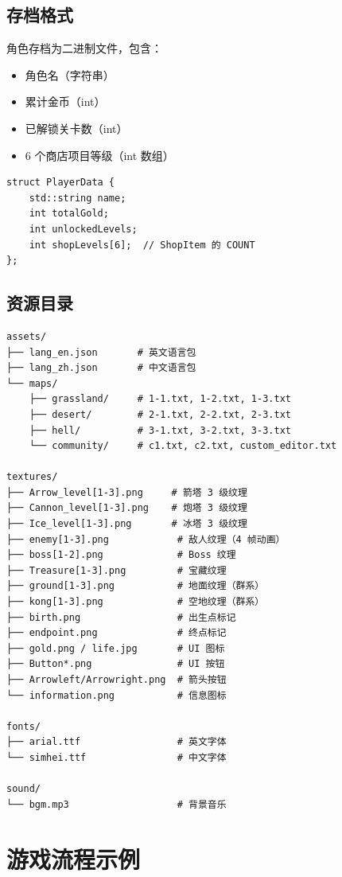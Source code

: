 \documentclass[12pt,a4paper]{ctexart}
\begin{document}
\subsection{存档格式}

角色存档为二进制文件，包含：
\begin{itemize}
    \item 角色名（字符串）
    \item 累计金币（int）
    \item 已解锁关卡数（int）
    \item 6 个商店项目等级（int 数组）
\end{itemize}

\begin{lstlisting}[caption={PlayerData 存档结构}]
struct PlayerData {
    std::string name;
    int totalGold;
    int unlockedLevels;
    int shopLevels[6];  // ShopItem 的 COUNT
};
\end{lstlisting}

\subsection{资源目录}

\begin{lstlisting}
assets/
├── lang_en.json       # 英文语言包
├── lang_zh.json       # 中文语言包
└── maps/
    ├── grassland/     # 1-1.txt, 1-2.txt, 1-3.txt
    ├── desert/        # 2-1.txt, 2-2.txt, 2-3.txt
    ├── hell/          # 3-1.txt, 3-2.txt, 3-3.txt
    └── community/     # c1.txt, c2.txt, custom_editor.txt

textures/
├── Arrow_level[1-3].png     # 箭塔 3 级纹理
├── Cannon_level[1-3].png    # 炮塔 3 级纹理
├── Ice_level[1-3].png       # 冰塔 3 级纹理
├── enemy[1-3].png            # 敌人纹理（4 帧动画）
├── boss[1-2].png             # Boss 纹理
├── Treasure[1-3].png         # 宝藏纹理
├── ground[1-3].png           # 地面纹理（群系）
├── kong[1-3].png             # 空地纹理（群系）
├── birth.png                 # 出生点标记
├── endpoint.png              # 终点标记
├── gold.png / life.jpg       # UI 图标
├── Button*.png               # UI 按钮
├── Arrowleft/Arrowright.png  # 箭头按钮
└── information.png           # 信息图标

fonts/
├── arial.ttf                 # 英文字体
└── simhei.ttf                # 中文字体

sound/
└── bgm.mp3                   # 背景音乐
\end{lstlisting}


\section{游戏流程示例}
\end{document}
